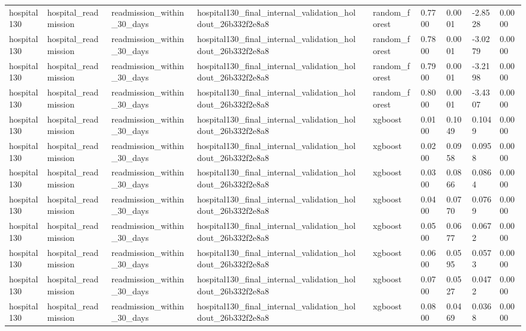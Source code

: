 \begin{tabular}{llllllllll}
hospital130 & hospital\_readmission & readmission\_within\_30\_days & hospital130\_final\_internal\_validation\_holdout\_26b332f2e8a8 &  & random\_forest & 0.7700 & 0.0001 & -2.8528 & 0.0000 \\
hospital130 & hospital\_readmission & readmission\_within\_30\_days & hospital130\_final\_internal\_validation\_holdout\_26b332f2e8a8 &  & random\_forest & 0.7800 & 0.0001 & -3.0279 & 0.0000 \\
hospital130 & hospital\_readmission & readmission\_within\_30\_days & hospital130\_final\_internal\_validation\_holdout\_26b332f2e8a8 &  & random\_forest & 0.7900 & 0.0001 & -3.2198 & 0.0000 \\
hospital130 & hospital\_readmission & readmission\_within\_30\_days & hospital130\_final\_internal\_validation\_holdout\_26b332f2e8a8 &  & random\_forest & 0.8000 & 0.0001 & -3.4307 & 0.0000 \\
hospital130 & hospital\_readmission & readmission\_within\_30\_days & hospital130\_final\_internal\_validation\_holdout\_26b332f2e8a8 &  & xgboost & 0.0100 & 0.1049 & 0.1049 & 0.0000 \\
hospital130 & hospital\_readmission & readmission\_within\_30\_days & hospital130\_final\_internal\_validation\_holdout\_26b332f2e8a8 &  & xgboost & 0.0200 & 0.0958 & 0.0958 & 0.0000 \\
hospital130 & hospital\_readmission & readmission\_within\_30\_days & hospital130\_final\_internal\_validation\_holdout\_26b332f2e8a8 &  & xgboost & 0.0300 & 0.0866 & 0.0864 & 0.0000 \\
hospital130 & hospital\_readmission & readmission\_within\_30\_days & hospital130\_final\_internal\_validation\_holdout\_26b332f2e8a8 &  & xgboost & 0.0400 & 0.0770 & 0.0769 & 0.0000 \\
hospital130 & hospital\_readmission & readmission\_within\_30\_days & hospital130\_final\_internal\_validation\_holdout\_26b332f2e8a8 &  & xgboost & 0.0500 & 0.0677 & 0.0672 & 0.0000 \\
hospital130 & hospital\_readmission & readmission\_within\_30\_days & hospital130\_final\_internal\_validation\_holdout\_26b332f2e8a8 &  & xgboost & 0.0600 & 0.0595 & 0.0573 & 0.0000 \\
hospital130 & hospital\_readmission & readmission\_within\_30\_days & hospital130\_final\_internal\_validation\_holdout\_26b332f2e8a8 &  & xgboost & 0.0700 & 0.0527 & 0.0472 & 0.0000 \\
hospital130 & hospital\_readmission & readmission\_within\_30\_days & hospital130\_final\_internal\_validation\_holdout\_26b332f2e8a8 &  & xgboost & 0.0800 & 0.0469 & 0.0368 & 0.0000 \\

\end{tabular}
